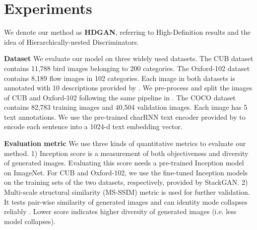 \documentclass[10pt,twocolumn,letterpaper]{article}
\begin{document}
\section{Experiments}
We denote our method as \textbf{HDGAN}, referring to High-Definition results and the idea of Hierarchically-nested Discriminators.

\textbf{Dataset} 
We evaluate our model on three widely used datasets. The CUB dataset \cite{welinder2010caltech} contains 11,788 bird images belonging to 200 categories. 
The Oxford-102 dataset \cite{Nilsback08} contains 8,189 flow images in 102 categories. 
Each image in both datasets is annotated with 10 descriptions provided by \cite{reed2016generative}. We pre-process and split the images of CUB and Oxford-102 following the same pipeline in \cite{reed2016generative,han2017stackgan}. The COCO dataset \cite{lin2014microsoft} contains 82,783 training images and 40,504 validation images. Each image has 5 text annotations. 
We use the pre-trained charRNN text encoder provided by \cite{reed2016generative} to encode each sentence into a 1024-d text embedding vector.

\textbf{Evaluation metric}
We use three kinds of quantitative metrics to evaluate our method.
1) Inception score \cite{improvedGAN} is a measurement of both objectiveness and diversity of generated images. Evaluating this score needs a pre-trained Inception model~\cite{inception} on ImageNet. For CUB and Oxford-102, we use the fine-tuned Inception models on the training sets of the two datasets, respectively, provided by StackGAN. 
2) Multi-scale structural similarity (MS-SSIM) metric \cite{improvedGAN} is used for further validation. It tests pair-wise similarity of generated images and can identity mode collapses reliably \cite{odena2016conditional}. Lower score indicates higher diversity of generated images (i.e. less model collapses). 
\end{document}
